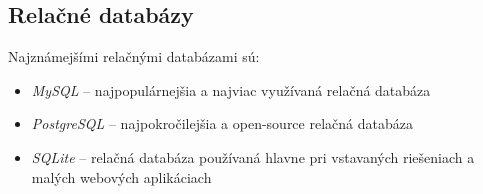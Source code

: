 \subsection*{Relačné databázy}

Najznámejšími relačnými databázami sú:

\begin{itemize}
    \item \emph{MySQL} -- najpopulárnejšia a najviac využívaná relačná databáza
    \item \emph{PostgreSQL} -- najpokročilejšia a open-source relačná databáza
    \item \emph{SQLite} -- relačná databáza používaná hlavne pri vstavaných riešeniach a malých webových aplikáciach
\end{itemize}